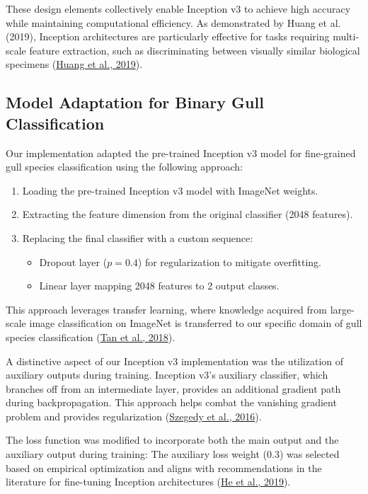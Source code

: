 \documentclass[a4paper,12pt]{article}
\begin{document}
These design elements collectively enable Inception v3 to achieve high accuracy while maintaining computational efficiency. As demonstrated by Huang et al. (2019), Inception architectures are particularly effective for tasks requiring multi-scale feature extraction, such as discriminating between visually similar biological specimens (\href{https://ieeexplore.ieee.org/document/8803812}{Huang et al., 2019}).

\subsection*{Model Adaptation for Binary Gull Classification}
Our implementation adapted the pre-trained Inception v3 model for fine-grained gull species classification using the following approach:
\begin{enumerate}
    \item Loading the pre-trained Inception v3 model with ImageNet weights.
    \item Extracting the feature dimension from the original classifier (2048 features).
    \item Replacing the final classifier with a custom sequence:
    \begin{itemize}
        \item Dropout layer ($p=0.4$) for regularization to mitigate overfitting.
        \item Linear layer mapping 2048 features to 2 output classes.
    \end{itemize}
\end{enumerate}

This approach leverages transfer learning, where knowledge acquired from large-scale image classification on ImageNet is transferred to our specific domain of gull species classification (\href{https://arxiv.org/abs/1805.08974}{Tan et al., 2018}).

A distinctive aspect of our Inception v3 implementation was the utilization of auxiliary outputs during training. Inception v3’s auxiliary classifier, which branches off from an intermediate layer, provides an additional gradient path during backpropagation. This approach helps combat the vanishing gradient problem and provides regularization (\href{https://arxiv.org/abs/1512.00567}{Szegedy et al., 2016}).

The loss function was modified to incorporate both the main output and the auxiliary output during training:
The auxiliary loss weight (0.3) was selected based on empirical optimization and aligns with recommendations in the literature for fine-tuning Inception architectures (\href{https://arxiv.org/abs/1902.04103}{He et al., 2019}).
\end{document}
